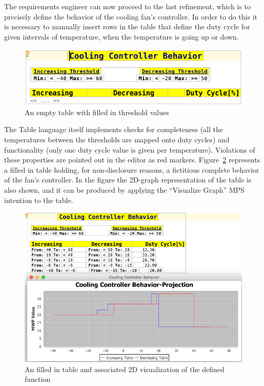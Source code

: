 The requirements engineer can now proceed to the last refinement, which is to
precisely define the behavior of the cooling fan's controller. In order to do
this it is necessary to manually insert rows in the table that define the duty cycle for
given intervals of temperature, when the temperature is going up or down. 
\begin{figure}[!h]
\centering 
\includegraphics[width=1\textwidth]{./figures/DiehlTable.png}
\caption{An empty table with filled in threshold values}
\label{fig:FAU_behavior_thresh}
\end{figure}
The \textsf{Table} language itself implements checks for completeness (all the
temperatures between the thresholds are mapped onto duty cycles) and functionality (only one duty
cycle value is given per temperature). Violations of these properties are
pointed out in the editor as red markers. Figure~\ref{fig:FAU_behavior_2d}
represents a filled in table holding, for non-disclosure reasons, a fictitious
complete behavior of the fan's controller. In the figure the 2D-graph
representation of the table is also shown, and it can be produced by applying
the “Visualize Graph” MPS intention to the table.

\begin{figure}[!h]
\centering
\includegraphics[width=1\textwidth]{./figures/DiehlTableAnd2DGraph.png}
\caption{An filled in table and associated 2D visualization of the defined
function}
\label{fig:FAU_behavior_2d}
\end{figure}

